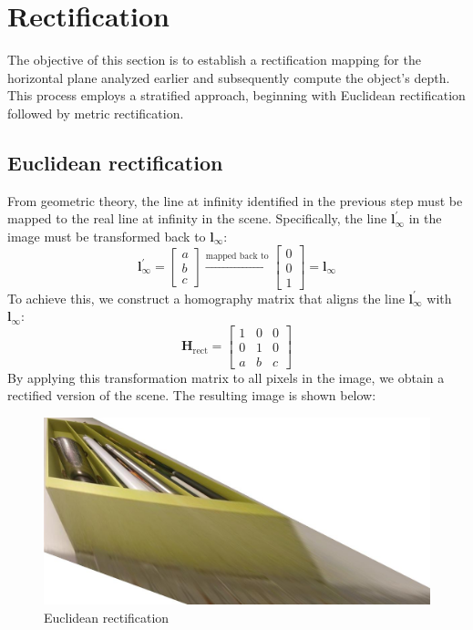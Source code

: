 \section{Rectification}

The objective of this section is to establish a rectification mapping for the horizontal plane analyzed earlier and subsequently compute the object's depth. 
This process employs a stratified approach, beginning with Euclidean rectification followed by metric rectification.

\subsection{Euclidean rectification}
From geometric theory, the line at infinity identified in the previous step must be mapped to the real line at infinity in the scene.
Specifically, the line $\mathbf{l}^\prime_{\infty}$ in the image must be transformed back to $\mathbf{l}_{\infty}$: 
\[\mathbf{l}^\prime_{\infty}=\begin{bmatrix}
    a \\ b \\ c
\end{bmatrix}\xrightarrow[]{\text{mapped back to}}\begin{bmatrix}
    0 \\ 0 \\ 1
\end{bmatrix}=\mathbf{l}_{\infty}\]
To achieve this, we construct a homography matrix that aligns the line $\mathbf{l}^\prime_{\infty}$ with $\mathbf{l}_{\infty}$: 
\[\mathbf{H}_{\text{rect}}=\begin{bmatrix}
    1 & 0 & 0 \\
    0 & 1 & 0 \\
    a & b & c
\end{bmatrix}\]
By applying this transformation matrix to all pixels in the image, we obtain a rectified version of the scene. 
The resulting image is shown below:
\begin{figure}[H]
    \centering
    \includegraphics[width=0.75\linewidth]{images/rectified.jpg}
    \caption{Euclidean rectification}
\end{figure}

